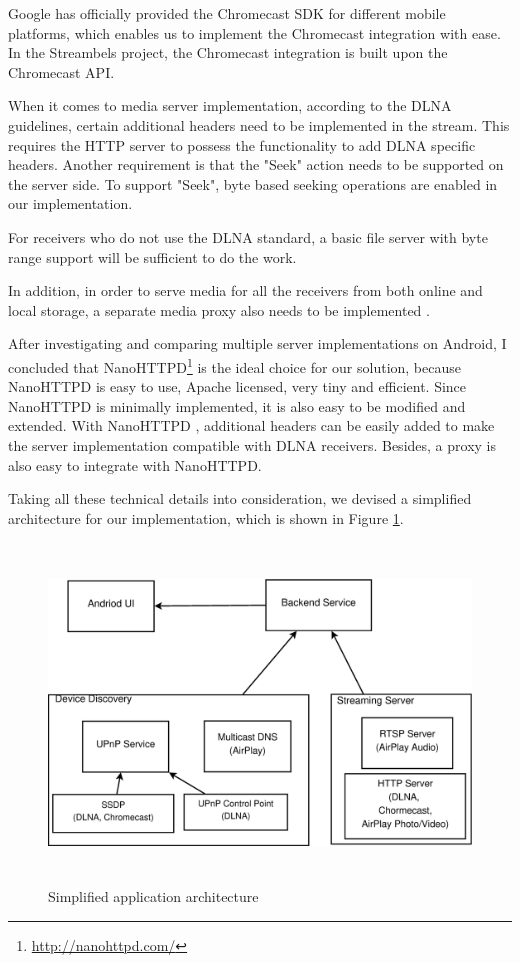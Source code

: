 Google has officially provided the Chromecast SDK for different mobile
platforms, which enables us to  implement the Chromecast integration with ease.
In the Streambels project, the Chromecast integration is built upon the
Chromecast API.

When it comes to media server implementation, according to the DLNA guidelines,
certain additional headers need to be implemented in the stream. This
requires the HTTP server to possess the functionality to add DLNA specific
headers. Another requirement is that the "Seek" action needs to be supported on
the server side. To support "Seek", byte based seeking operations are enabled
in our implementation.

For receivers who do not use the DLNA standard, a basic file server with byte
range support will be sufficient to do the work.

In addition, in order to serve media for all the receivers from both online and
local storage, a separate media proxy also needs to be implemented
\cite{ipv6} \cite{DLNA_proxy2}.

After investigating and comparing multiple server implementations on Android, I
concluded that NanoHTTPD\footnote{\url{http://nanohttpd.com/}} is the ideal
choice for our solution, because NanoHTTPD is easy to use, Apache licensed,
very tiny and efficient. Since NanoHTTPD is minimally implemented, it is also
easy to be modified and extended. With NanoHTTPD , additional headers can be
easily added to make the server implementation compatible with DLNA receivers.
Besides, a proxy is also easy to integrate with  NanoHTTPD.

Taking all these technical details into consideration, we devised a simplified
architecture for our implementation, which is shown in Figure \ref{chart3}.

\begin{figure}[htb]
\centering \includegraphics[height=9cm]{charts/chart3}
\caption{Simplified application architecture\label{chart3}}
\end{figure}

